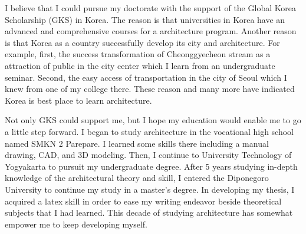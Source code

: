 \documentclass[../main.tex]{subfiles}
\begin{document}
I believe that I could pursue my doctorate with the support of the Global Korea Scholarship (GKS) in Korea. The reason is that universities in Korea have an advanced and comprehensive courses for a architecture program. Another reason is that Korea as a country successfully develop its city and architecture.
For example, first, the success transformation of Cheonggyecheon stream as a attraction of public in the city center which I learn from an undergraduate seminar.
Second, the easy access of transportation in the city of Seoul which I knew from one of my college there. These reason and many more have indicated Korea is best place to learn architecture.


Not only GKS could support me, but I hope my education would enable me to go a little step forward. I began to study architecture in the vocational high school named SMKN 2 Parepare. I learned some skills there including a manual drawing, CAD, and 3D modeling. Then, I continue to University Technology of Yogyakarta to pursuit my undergraduate degree. After 5 years studying in-depth knowledge of the architectural theory and skill, I entered the Diponegoro University to continue my study in a master's degree. In developing my thesis, I acquired a latex skill in order to ease my writing endeavor beside theoretical subjects that I had learned.
This decade of studying architecture has somewhat empower me to keep developing myself.


\end{document}

